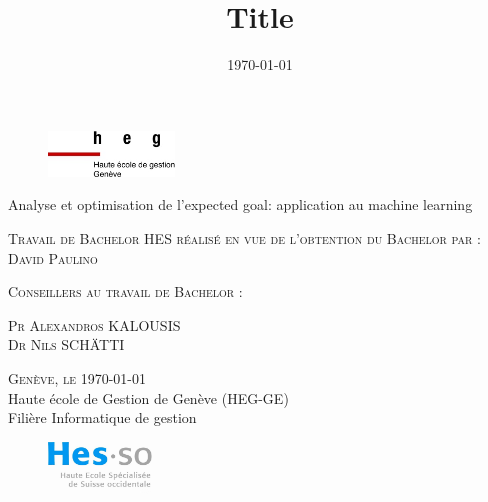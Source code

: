 \documentclass[12pt]{article}
\title{Title}
\author{\DP}
\date{\today}
\newcommand{\DP}{David Paulino}
\newcommand{\place}{Genève}
\newcommand{\fulltitle}{Analyse et optimisation de l'expected goal: application au machine learning}
\begin{document}
\begin{titlepage}

    \begin{figure}[h]
        \includegraphics[width=0.3\textwidth]{img/logo_heg-ge.jpg}
    \end{figure}

    \vspace*{0.5cm}

    \begin{center}

        \begingroup \linespread{1,75} \selectfont
        {\Large \fulltitle}\\[0,75cm]
        \endgroup



        \vspace{1.5cm}

        \textsc{\large Travail de Bachelor HES réalisé en vue de \newline l’obtention du Bachelor par :}\\[0,50cm]

        \begingroup \linespread{1,75} \selectfont
        \textsc{\large \DP}\\[0,50cm]
        \endgroup


        \vspace{1cm}


        \textsc{\large Conseillers au travail de Bachelor : }

        \begingroup \linespread{1,75} \selectfont
        \textsc{\large Pr Alexandros KALOUSIS}\\[0.1cm]
        \textsc{\large Dr Nils SCHÄTTI}\\[1cm]
        \endgroup


        \begingroup \linespread{1,75} \selectfont
        \textsc{\large \place, le \today}\\[0,25cm]

        {\large Haute école de Gestion de Genève (HEG-GE)}\\[0,25cm]

        {\large Filière Informatique de gestion}\\[0,25cm]
        \endgroup



        \begin{figure}[h]
            \vspace*{1cm}
            \hspace*{12cm}\includegraphics[width=0.25\textwidth]{img/logo_hes-so.jpg}
        \end{figure}

    \end{center}



    \vfill
\end{titlepage}
\end{document}
